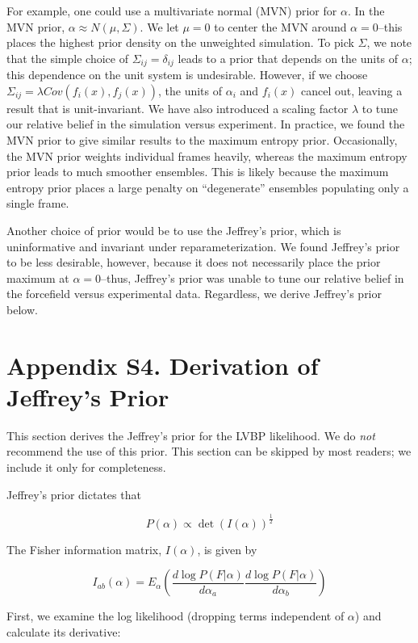 \documentclass[journal=jacsat,manuscript=article]{achemso}
\begin{document}
For example, one could use a multivariate normal (MVN) prior for $\alpha$.  In the MVN prior, $\alpha \approx N(\mu,\Sigma)$.  We let $\mu = 0$ to center the MVN around $\alpha = 0$--this places the highest prior density on the unweighted simulation.  To pick $\Sigma$, we note that the simple choice of $\Sigma_{ij} = \delta_{ij}$ leads to a prior that depends on the units of $\alpha$; this dependence on the unit system is undesirable.  However, if we choose $\Sigma_{ij} = \lambda Cov(f_i(x), f_j(x))$, the units of $\alpha_i$ and $f_i(x)$ cancel out, leaving a result that is unit-invariant.  We have also introduced a scaling factor $\lambda$ to tune our relative belief in the simulation versus experiment.  In practice, we found the MVN prior to give similar results to the maximum entropy prior.  Occasionally, the MVN prior weights individual frames heavily, whereas the maximum entropy prior leads to much smoother ensembles.  This is likely because the maximum entropy prior places a large penalty on ``degenerate'' ensembles populating only a single frame.  

Another choice of prior would be to use the Jeffrey's prior, which is uninformative and invariant under reparameterization.  We found Jeffrey's prior to be less desirable, however, because it does not necessarily place the prior maximum at $\alpha = 0$--thus, Jeffrey's prior was unable to tune our relative belief in the forcefield versus experimental data.  Regardless, we derive Jeffrey's prior below.


\section{Appendix S4.  Derivation of Jeffrey's Prior}

This section derives the Jeffrey's prior for the LVBP likelihood.  We do \emph{not} recommend the use of this prior.  This section can be skipped by most readers; we include it only for completeness.

Jeffrey's prior dictates that 

$$P(\alpha) \propto \det(I(\alpha))^\frac{1}{2}$$

The Fisher information matrix, $I(\alpha)$, is given by

$$I_{ab}(\alpha) = E_\alpha(\frac{d\log P(F|\alpha)}{d\alpha_{a}}\frac{d\log P(F|\alpha)}{d\alpha_{b}})$$

First, we examine the log likelihood (dropping terms independent of $\alpha$) and calculate its derivative:
\end{document}
